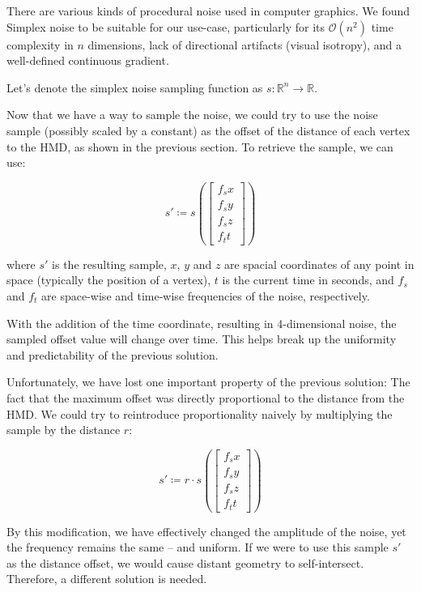 There are various kinds of procedural noise used in computer graphics. We found Simplex noise \autocite{olano2002simplex} to be suitable for our use-case, particularly for its $\mathcal{O}(n^2)$ time complexity in $n$ dimensions, lack of directional artifacts (visual isotropy), and a well-defined continuous gradient.

Let's denote the simplex noise sampling function as $s \colon \mathbb{R}^n \to \mathbb{R}$.

Now that we have a way to sample the noise, we could try to use the noise sample (possibly scaled by a constant) as the offset of the distance of each vertex to the \ac{HMD}, as shown in the previous section. To retrieve the sample, we can use:

\begin{equation}
    s' \coloneqq s\left(\begin{bmatrix}f_sx\\f_sy\\f_sz\\f_tt\end{bmatrix}\right)
\end{equation}

where $s'$ is the resulting sample, $x$, $y$ and $z$ are spacial coordinates of any point in space (typically the position of a vertex), $t$ is the current time in seconds, and $f_s$ and $f_t$ are space-wise and time-wise frequencies of the noise, respectively.

With the addition of the time coordinate, resulting in 4-dimensional noise, the sampled offset value will change over time. This helps break up the uniformity and predictability of the previous solution.

Unfortunately, we have lost one important property of the previous solution: The fact that the maximum offset was directly proportional to the distance from the \ac{HMD}. We could try to reintroduce proportionality naively by multiplying the sample by the distance $r$:

\begin{equation}
    s' \coloneqq r \cdot s\left(\begin{bmatrix}f_sx\\f_sy\\f_sz\\f_tt\end{bmatrix}\right)
\end{equation}

By this modification, we have effectively changed the amplitude of the noise, yet the frequency remains the same -- and uniform. If we were to use this sample $s'$ as the distance offset, we would cause distant geometry to self-intersect. Therefore, a different solution is needed.

